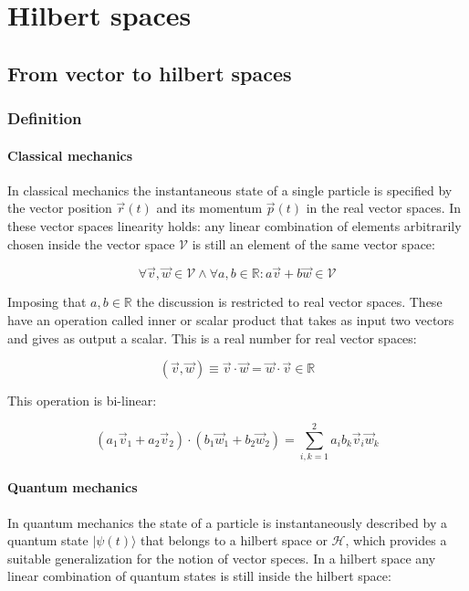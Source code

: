 \chapter{Hilbert spaces}

\section{From vector to hilbert spaces}

	\subsection{Definition}

		\subsubsection{Classical mechanics}
		In classical mechanics the instantaneous state of a single particle is specified by the vector position $\vec{r}(t)$ and its momentum $\vec{p}(t)$ in the real vector spaces.
		In these vector spaces linearity holds: any linear combination of elements arbitrarily chosen inside the vector space $\mathcal{V}$ is still an element of the same vector space:

		$$\forall \vec{v}, \vec{w}\in\mathcal{V}\land\forall a, b\in\mathbb{R}: a\vec{v}+b\vec{w}\in\mathcal{V}$$

		Imposing that $a,b\in\mathbb{R}$ the discussion is restricted to real vector spaces.
		These have an operation called inner or scalar product that takes as input two vectors and gives as output a scalar.
		This is a real number for real vector spaces:

		$$(\vec{v}, \vec{w})\equiv \vec{v}\cdot\vec{w} = \vec{w}\cdot\vec{v}\in\mathbb{R}$$

		This operation is bi-linear:

		$$(a_1\vec{v}_1 + a_2\vec{v}_2)\cdot(b_1\vec{w}_1 + b_2\vec{w}_2) = \sum\limits_{i, k=1}^2 a_ib_k\vec{v}_i\vec{w}_k$$

		\subsubsection{Quantum mechanics}
		In quantum mechanics the state of a particle is instantaneously described by a quantum state $|\psi(t)\rangle$ that belongs to a hilbert space or $\mathcal{H}$, which provides a suitable generalization for the notion of vector speces.
		In a hilbert space any linear combination of quantum states is still inside the hilbert space:

